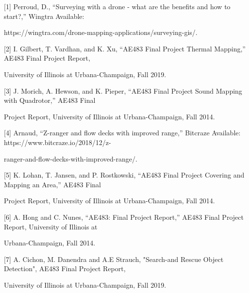 [1] Perroud, D., “Surveying with a drone - what are the benefits and how to start?,” Wingtra Available:

\hspace{4.5mm} https://wingtra.com/drone-mapping-applications/surveying-gis/. 

[2] I. Gilbert, T. Vardhan, and K. Xu, “AE483 Final Project Thermal Mapping,” AE483 Final Project Report, 

\hspace{4.5mm} University of Illinois at Urbana-Champaign, Fall 2019.

[3] J. Morich, A. Hewson, and K. Pieper, “AE483 Final Project Sound Mapping with Quadrotor,” AE483 Final 

\hspace{4.5mm} Project Report, University of Illinois at Urbana-Champaign, Fall 2014.

[4] Arnaud, “Z-ranger and flow decks with improved range,” Bitcraze Available: https://www.bitcraze.io/2018/12/z-

\hspace{4.5mm} ranger-and-flow-decks-with-improved-range/. 

[5] K. Lohan, T. Jansen, and P. Rostkowski, “AE483 Final Project Covering and Mapping an Area,” AE483 Final 

\hspace{4.5mm} Project Report, University of Illinois at Urbana-Champaign, Fall 2014.

[6] A. Hong and C. Nunes, “AE483: Final Project Report,” AE483 Final Project Report, University of Illinois at 

\hspace{4.5mm} Urbana-Champaign, Fall 2014.

[7] A. Cichon, M. Danendra and A.E Strauch, "Search-and Rescue Object Detection", AE483 Final Project Report, 

\hspace{4.5mm} University of Illinois at Urbana-Champaign, Fall 2019.


